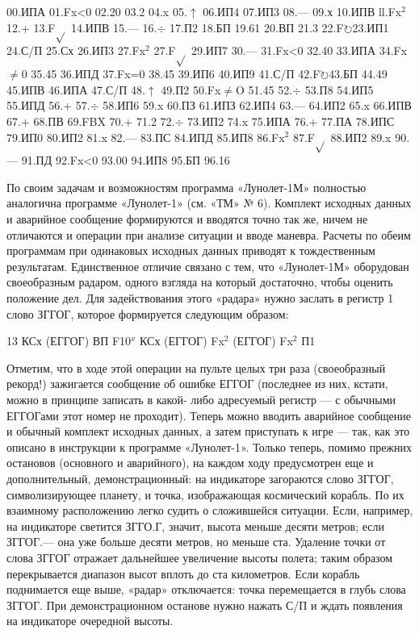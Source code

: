 \documentclass[11pt,a4paper,oneside]{article}
\def\FO{F$\circlearrowright$}
\begin{document}
00.ИПА 01.Fx<0 02.20 03.2 04.x 05.$\uparrow$ 06.ИП4 07.ИП3 08.— 09.х 10.ИПВ ll.Fx$^{2}$ 12.+ 13.F$\sqrt{}$ 14.ИПВ 15.— 16.$\div$ 17.П2 18.БП 19.61 20.ВП 21.3 22.\FO 23.ИП1 24.С/П 25.Сх 26.ИП3 27.Fx$^{2}$
27.F$\sqrt{}$ 29.ИП7 30.— 31.Fx<0 32.40
33.ИПА 34.Fx$\neq$0 35.45 36.ИПД
37.Fx=0 38.45 39.ИП6 40.ИП9 41.С/П 42.\FO 43.БП 44.49 45.ИПВ 46.ИПА 47.С/П 48.$\uparrow$ 49.П2 50.Fx$\neq$O 51.45 
52.$\div$ 53.П8 54.ИП5 55.ИПД 56.+ 57.$\div$ 58.ИП6 59.x 60.ПЗ 61.ИПЗ 62.ИП4 63.— 64.ИП2 65.x 66.ИПВ 67.+	68.ПВ
69.FBX 70.+ 71.2 72.$\div$ 73.ИП2 74.x 75.ИПА 76.+ 77.ПА 78.ИПС 79.ИП0 80.ИП2 81.x 82.— 83.ПС 84.ИПД
85.ИП8 86.Fx$^{2}$ 87.F$\sqrt{}$ 88.ИП2 89.x
90.— 91.ПД 92.Fx<0 93.00 94.ИП8 95.БП 96.16

По своим задачам и возможностям программа «Лунолет-1М» полностью аналогична программе «Лунолет-1» (см. «ТМ» № 6). Комплект исходных данных и аварийное сообщение формируются и вводятся точно так же, ничем не отличаются и операции при анализе ситуации и вводе маневра. Расчеты по обеим программам при одинаковых исходных данных приводят к тождественным результатам. Единственное отличие связано с тем, что «Лунолет-1М» оборудован своеобразным радаром, одного взгляда на который достаточно, чтобы оценить положение дел. Для задействования этого «радара» нужно заслать в регистр 1 слово ЗГГОГ, которое формируется следующим образом:

13 КСх (ЕГГОГ) ВП F10$^{x}$ КСх (ЕГГОГ) Fx$^{2}$ (ЕГГОГ) Fx$^{2}$ П1

Отметим, что в ходе этой операции на пульте целых три раза (своеобразный рекорд!) зажигается сообщение об ошибке ЕГГОГ (последнее из них, кстати, можно в принципе записать в какой- либо адресуемый регистр — с обычными ЕГГОГами этот номер не проходит). Теперь можно вводить аварийное сообщение и обычный комплект исходных данных, а затем приступать к игре —
так, как это описано в инструкции к программе «Лунолет-1». Только теперь, помимо прежних остановов (основного и аварийного), на каждом ходу предусмотрен еще и дополнительный, демонстрационный: на индикаторе загораются слово ЗГГОГ, символизирующее планету, и точка, изображающая космический корабль. По их взаимному расположению легко судить о сложившейся ситуации. Если, например, на индикаторе светится ЗГГО.Г, значит, высота меньше десяти метров; если ЗГГОГ.— она уже больше десяти метров, но меньше ста. Удаление точки от слова ЗГГОГ отражает дальнейшее увеличение высоты полета; таким образом перекрывается диапазон высот вплоть до ста километров. Если корабль поднимается еще выше, «радар» отключается:	точка перемещается в глубь слова ЗГГОГ. При демонстрационном останове нужно нажать С/П и ждать появления на индикаторе очередной высоты.
\end{document}
